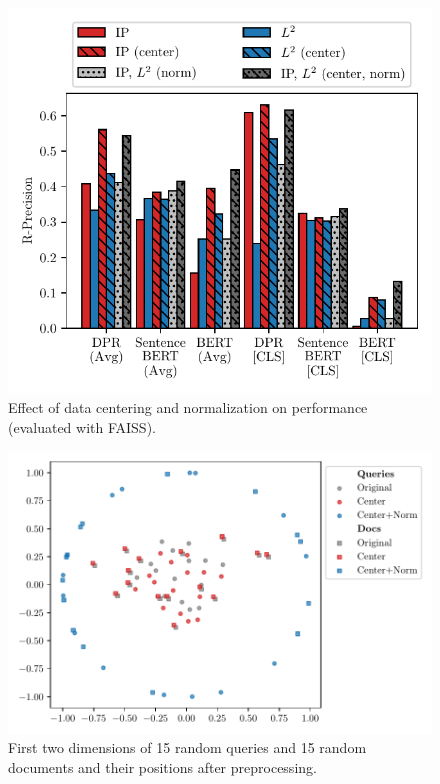\begin{figure}[ht]
    \center
    \includegraphics[width=0.7\linewidth]{img/model_normalization.pdf}

    \caption{Effect of data centering and normalization on performance  (evaluated with FAISS).}
    \label{fig:model_normalization}
\end{figure}

\begin{figure}[ht]
    \center
    \includegraphics[width=0.9\linewidth]{img/norm_examples.pdf}

    \caption{First two dimensions of 15 random queries and 15 random documents and their positions after preprocessing.}
    \label{fig:norm_example}
\end{figure}

